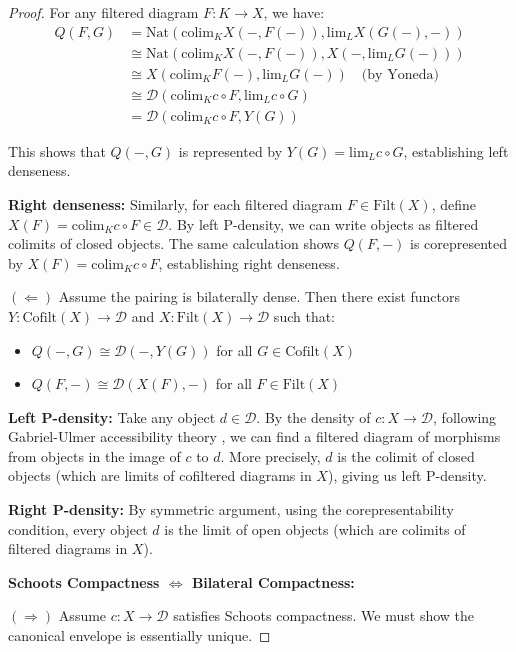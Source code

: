 \documentclass[11pt]{article}
\theoremstyle{plain}
\theoremstyle{definition}
\theoremstyle{remark}
\newcommand{\colim}{\mathrm{colim}}
\renewcommand{\lim}{\mathrm{lim}}
\begin{document}
\begin{proof}
For any filtered diagram $F : K \to X$, we have:
\begin{align}
Q(F, G) &= \mathrm{Nat}(\colim_K X(-, F(-)), \lim_L X(G(-), -)) \\
&\cong \mathrm{Nat}(\colim_K X(-, F(-)), X(-, \lim_L G(-))) \\
&\cong X(\colim_K F(-), \lim_L G(-)) \quad \text{(by Yoneda)} \\
&\cong \mathcal{D}(\colim_K c \circ F, \lim_L c \circ G) \\
&= \mathcal{D}(\colim_K c \circ F, Y(G))
\end{align}

This shows that $Q(-, G)$ is represented by $Y(G) = \lim_L c \circ G$, establishing left denseness.

\textbf{Right denseness:} Similarly, for each filtered diagram $F \in \mathrm{Filt}(X)$, define $X(F) = \colim_K c \circ F \in \mathcal{D}$. By left P-density, we can write objects as filtered colimits of closed objects. The same calculation shows $Q(F, -)$ is corepresented by $X(F) = \colim_K c \circ F$, establishing right denseness.

$(\Leftarrow)$ Assume the pairing is bilaterally dense. Then there exist functors $Y : \mathrm{Cofilt}(X) \to \mathcal{D}$ and $X : \mathrm{Filt}(X) \to \mathcal{D}$ such that:
\begin{itemize}
\item $Q(-, G) \cong \mathcal{D}(-, Y(G))$ for all $G \in \mathrm{Cofilt}(X)$
\item $Q(F, -) \cong \mathcal{D}(X(F), -)$ for all $F \in \mathrm{Filt}(X)$
\end{itemize}

\textbf{Left P-density:} Take any object $d \in \mathcal{D}$. By the density of $c : X \to \mathcal{D}$, following Gabriel-Ulmer accessibility theory \cite{gabriel1971lokal}, we can find a filtered diagram of morphisms from objects in the image of $c$ to $d$. More precisely, $d$ is the colimit of closed objects (which are limits of cofiltered diagrams in $X$), giving us left P-density.

\textbf{Right P-density:} By symmetric argument, using the corepresentability condition, every object $d$ is the limit of open objects (which are colimits of filtered diagrams in $X$).

\textbf{Schoots Compactness $\Leftrightarrow$ Bilateral Compactness:}

$(\Rightarrow)$ Assume $c : X \to \mathcal{D}$ satisfies Schoots compactness. We must show the canonical envelope is essentially unique.


\end{proof}
\end{document}
